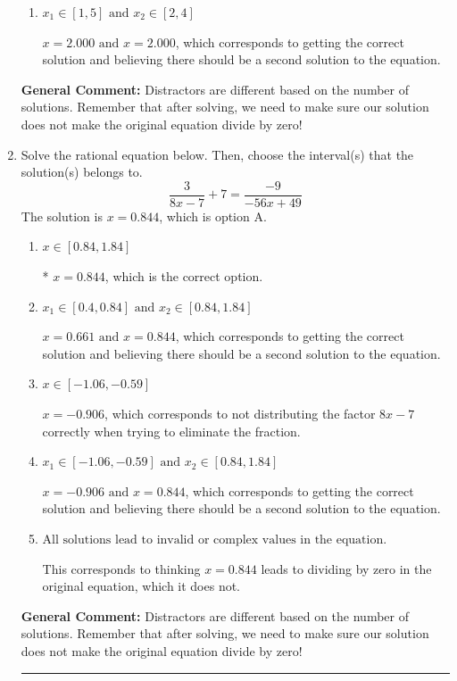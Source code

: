 \documentclass{extbook}[14pt]
\newcommand{\litem}[1]{\item #1

\rule{\textwidth}{0.4pt}}
\begin{document}
\begin{enumerate}
{\begin{enumerate}[label=\Alph*.]
$x = -2.000$, which corresponds to not distributing the factor $-24x + 48$ correctly when trying to eliminate the fraction.
\item \( x_1 \in [1, 5] \text{ and } x_2 \in [2,4] \)

$x = 2.000 \text{ and } x = 2.000$, which corresponds to getting the correct solution and believing there should be a second solution to the equation.
\end{enumerate}

\textbf{General Comment:} Distractors are different based on the number of solutions. Remember that after solving, we need to make sure our solution does not make the original equation divide by zero!
}
\litem{
Solve the rational equation below. Then, choose the interval(s) that the solution(s) belongs to.
\[ \frac{3}{8x -7} + 7 = \frac{-9}{-56x + 49} \]The solution is \( x = 0.844 \), which is option A.\begin{enumerate}[label=\Alph*.]
\item \( x \in [0.84,1.84] \)

* $x = 0.844$, which is the correct option.
\item \( x_1 \in [0.4, 0.84] \text{ and } x_2 \in [0.84,1.84] \)

$x = 0.661 \text{ and } x = 0.844$, which corresponds to getting the correct solution and believing there should be a second solution to the equation.
\item \( x \in [-1.06,-0.59] \)

$x = -0.906$, which corresponds to not distributing the factor $8x -7$ correctly when trying to eliminate the fraction.
\item \( x_1 \in [-1.06, -0.59] \text{ and } x_2 \in [0.84,1.84] \)

$x = -0.906 \text{ and } x = 0.844$, which corresponds to getting the correct solution and believing there should be a second solution to the equation.
\item \( \text{All solutions lead to invalid or complex values in the equation.} \)

This corresponds to thinking $x = 0.844$ leads to dividing by zero in the original equation, which it does not.
\end{enumerate}

\textbf{General Comment:} Distractors are different based on the number of solutions. Remember that after solving, we need to make sure our solution does not make the original equation divide by zero!
}
\end{enumerate}
\end{document}
